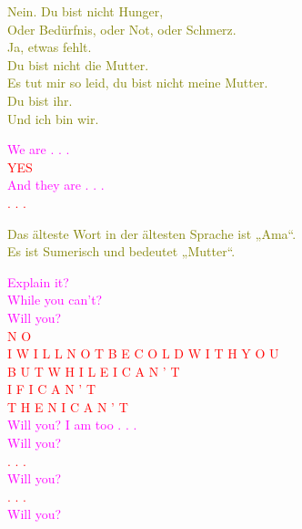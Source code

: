 \documentclass[11pt]{article}
\begin{document}
\begingroup
\begin{center}
\textcolor{olive}{Nein. Du bist nicht Hunger, \\ Oder Bedürfnis, oder Not, oder Schmerz. \\ Ja, etwas fehlt. \\ Du bist nicht die Mutter. \\ Es tut mir so leid, du bist nicht meine Mutter. \\ Du bist ihr. \\ Und ich bin wir. } 
\end{center}
\endgroup

\begingroup
\begin{center}
\textcolor{magenta}{We are . . .} \\ \textcolor{red}{YES} \\ \textcolor{magenta}{And they are . . .} \\ \textcolor{red}{. . .}
\end{center}
\endgroup

\begingroup
\begin{center}
\textcolor{olive}{Das älteste Wort in der ältesten Sprache ist „Ama“. \\ Es ist Sumerisch und bedeutet „Mutter“.}
\end{center}
\endgroup

\begingroup
\begin{center}
\textcolor{magenta}{Explain it? \\ While you can't? \\ Will you?} \\ \textcolor{red}{N O \\ I \hspace{10mm} W I L L \hspace{10mm} N O T \hspace{10mm} B E \hspace{10mm} C O L D \hspace{10mm} W I T H \hspace{10mm} Y O U \\ B U T \hspace{10mm} W H I L E \hspace{10mm} I \hspace{10mm} C A N ' T \\ I F \hspace{10mm} I \hspace{10mm} C A N ' T \\ T H E N \hspace{10mm} I \hspace{10mm} C A N ' T} \\ \textcolor{magenta}{Will you? I am too . . . \\ Will you?} \\ \textcolor{red}{. . .} \\ \textcolor{magenta}{Will you?} \\ \textcolor{red}{. . .} \\ \textcolor{magenta}{Will you?}
\end{center}
\endgroup
\end{document}
